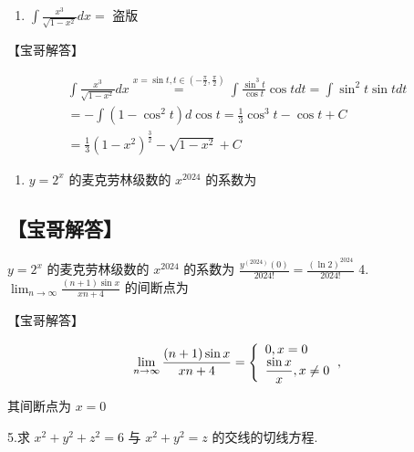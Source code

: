\documentclass[11pt,fontset=fandol]{ctexart}
\providecommand{\tightlist}{\setlength{\itemsep}{0pt}\setlength{\parskip}{0pt}}
\begin{document}
\begin{enumerate}
\def\labelenumi{\arabic{enumi}.}
\setcounter{enumi}{1}
\tightlist
\item
  \(\int \frac { x ^ { 3 } } { \sqrt { 1 - x ^ { 2 } } } d x =\) 盗版
\end{enumerate}

【宝哥解答】

\[
\begin{array} { l } { { \displaystyle { \int \frac { x ^ { 3 } } { \sqrt { 1 - x ^ { 2 } } } d x \stackrel { x = \sin t , t \in ( - \frac { \pi } { 2 } , \frac { \pi } { 2 } ) } { = } \int \frac { \sin ^ { 3 } t } { \cos t } \cos t d t = \int \sin ^ { 2 } t \sin t d t } } } \\ { { \displaystyle { = - \int ( 1 - \cos ^ { 2 } t ) d \cos t = \frac { 1 } { 3 } \cos ^ { 3 } t - \cos t + C \ ~ } } } \\ { { \displaystyle { = \frac { 1 } { 3 } ( 1 - x ^ { 2 } ) ^ { \frac { 3 } { 2 } } - \sqrt { 1 - x ^ { 2 } } + C } } } \end{array}
\]

\begin{enumerate}
\def\labelenumi{\arabic{enumi}.}
\setcounter{enumi}{2}
\tightlist
\item
  \(y = 2 ^ { x }\) 的麦克劳林级数的 \(x ^ { 2 0 2 4 }\) 的系数为
\end{enumerate}

\subsection{【宝哥解答】}\label{ux5b9dux54e5ux89e3ux7b54-1}

\(y = 2 ^ { x }\) 的麦克劳林级数的 \(x ^ { 2 0 2 4 }\) 的系数为
\({ \frac { y ^ { ( 2 0 2 4 ) } ( 0 ) } { 2 0 2 4 ! } } = { \frac { ( \ln 2 ) ^ { 2 0 2 4 } } { 2 0 2 4 ! } }\)
4.
\(\lim _ { n \to \infty } { \frac { ( n + 1 ) \sin x } { x n + 4 } }\)
的间断点为

【宝哥解答】

\[
\lim _ { n \to \infty } { \frac { ( n + 1 ) \sin x } { x n + 4 } } = { \left\{ \begin{array} { l l } { 0 , x = 0 } \\ { \displaystyle { \frac { \sin x } { x } } , x \neq 0 } \end{array} \right. } ,
\]

其间断点为 \(x = 0\)

5.求 \(x ^ { 2 } + y ^ { 2 } + z ^ { 2 } = 6\) 与
\(x ^ { 2 } + y ^ { 2 } = z\) 的交线的切线方程.
\end{document}
